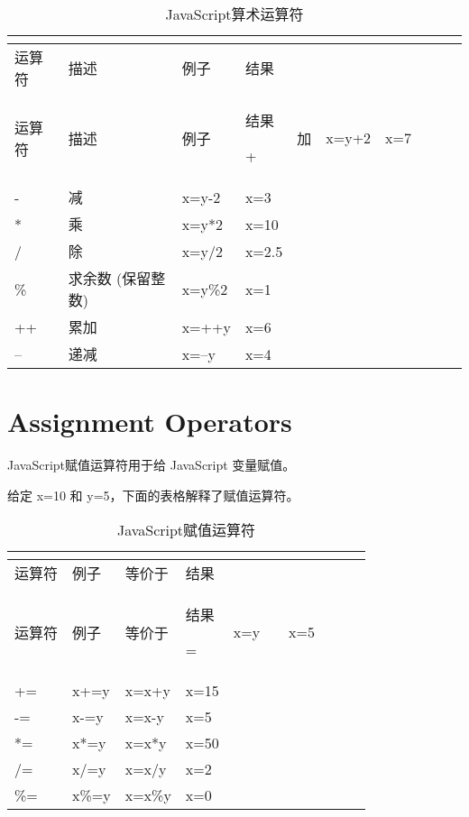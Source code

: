 \begin{longtable}{|m{90pt}|m{90pt}|m{90pt}|m{90pt}|}
\tabularnewline\hline
运算符	&描述	&例子	&结果
\endhead

\caption{JavaScript算术运算符}\\
\hline
运算符	&描述	&例子	&结果
\endfirsthead

\endfoot

\endlastfoot
\hline
+	&加					& x=y+2	&x=7\\
\hline
-	&减					& x=y-2	&x=3\\
\hline
*	&乘					& x=y*2	&x=10\\
\hline
/	&除					& x=y/2	&x=2.5\\
\hline
\%	&求余数 (保留整数)	&x=y\%2	&x=1\\
\hline
++	&累加				& x=++y	&x=6\\
\hline
--	&递减				& x=--y		& x=4\\
\hline


\end{longtable}


\section{Assignment Operators}


JavaScript赋值运算符用于给 JavaScript 变量赋值。

给定 x=10 和 y=5，下面的表格解释了赋值运算符。

\begin{longtable}{|m{90pt}|m{90pt}|m{90pt}|m{90pt}|}
\tabularnewline\hline
运算符	&例子	&等价于	&结果
\endhead

\caption{JavaScript赋值运算符}\\
\hline
运算符	&例子	&等价于	&结果
\endfirsthead

\endfoot

\endlastfoot
\hline
=	&x=y	& 			& x=5\\
\hline
+=	&x+=y	&x=x+y	&x=15\\
\hline
-=	&x-=y	&x=x-y		& x=5\\
\hline
*=	&x*=y	&x=x*y		& x=50\\
\hline
/=	&x/=y	&x=x/y		& x=2\\
\hline
\%=	&x\%=y	&x=x\%y	& x=0\\
\hline

\end{longtable}





